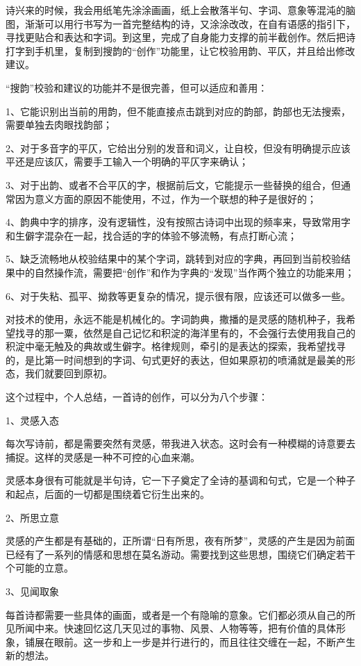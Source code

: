 \documentclass{article}
\begin{document}
诗兴来的时候，我会用纸笔先涂涂画画，纸上会散落半句、字词、意象等混沌的脑图，渐渐可以用行书写为一首完整结构的诗，又涂涂改改，在自有语感的指引下，寻找更贴合和表达和字词。到这里，完成了自身能力支撑的前半截创作。然后把诗打字到手机里，复制到搜韵的``创作''功能里，让它校验用韵、平仄，并且给出修改建议。

``搜韵''校验和建议的功能并不是很完善，但可以适应和善用：

1、它能识别出当前的用韵，但不能直接点击跳到对应的韵部，韵部也无法搜索，需要单独去肉眼找韵部；

2、对于多音字的平仄，它给出分别的发音和词义，让自校，但没有明确提示应该平还是应该仄，需要手工输入一个明确的平仄字来确认；

3、对于出韵、或者不合平仄的字，根据前后文，它能提示一些替换的组合，但通常因为意义方面的原因不能使用，不过，作为一个联想的种子是很好的；

4、韵典中字的排序，没有逻辑性，没有按照古诗词中出现的频率来，导致常用字和生僻字混杂在一起，找合适的字的体验不够流畅，有点打断心流；

5、缺乏流畅地从校验结果中的某个字词，跳转到对应的字典，再回到当前校验结果中的自然操作流，需要把``创作''和作为字典的``发现''当作两个独立的功能来用；

6、对于失粘、孤平、拗救等更复杂的情况，提示很有限，应该还可以做多一些。

对技术的使用，永远不能是机械化的。字词韵典，撒播的是灵感的随机种子，我希望找寻的那一粟，依然是自己记忆和积淀的海洋里有的，不会强行去使用我自己的积淀中毫无触及的典故或生僻字。格律规则，牵引的是表达的探索，我希望找寻的，是比第一时间想到的字词、句式更好的表达，但如果原初的喷涌就是最美的形态，我们就要回到原初。

这个过程中，个人总结，一首诗的创作，可以分为八个步骤：

1、灵感入态

每次写诗前，都是需要突然有灵感，带我进入状态。这时会有一种模糊的诗意要去捕捉。这样的灵感是一种不可控的心血来潮。

灵感本身很有可能就是半句诗，它一下子奠定了全诗的基调和句式，它是一个种子和起点，后面的一切都是围绕着它衍生出来的。

2、所思立意

灵感的产生都是有基础的，正所谓``日有所思，夜有所梦''，灵感的产生是因为前面已经有了一系列的情感和思想在莫名游动。需要找到这些思想，围绕它们确定若干个可能的立意。

3、见闻取象

每首诗都需要一些具体的画面，或者是一个有隐喻的意象。它们都必须从自己的所见所闻中来。快速回忆这几天见过的事物、风景、人物等等，把有价值的具体形象，铺展在眼前。这一步和上一步是并行进行的，而且往往交缠在一起，不断产生新的想法。
\end{document}
